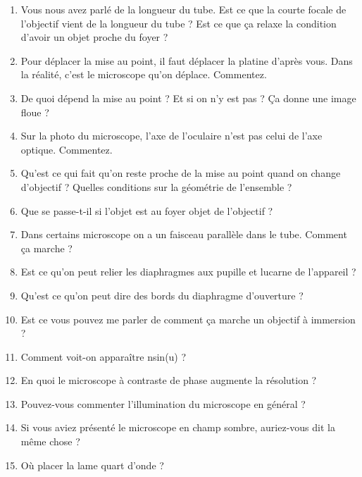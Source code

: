 \begin{enumerate}
\item Vous nous avez parlé de la longueur du tube. Est ce que la courte focale de l'objectif vient de la longueur du tube ? Est ce que ça relaxe la condition d'avoir un objet proche du foyer ?
\item Pour déplacer la mise au point, il faut déplacer la platine d'après vous. Dans la réalité, c'est le microscope qu'on déplace. Commentez.
\item De quoi dépend la mise au point ? Et si on n'y est pas ? Ça donne une image floue ?
\item Sur la photo du microscope, l'axe de l'oculaire n'est pas celui de l'axe optique. Commentez.
\item Qu'est ce qui fait qu'on reste proche de la mise au point quand on change d'objectif ? Quelles conditions sur la géométrie de l'ensemble ?
\item Que se passe-t-il si l'objet est au foyer objet de l'objectif ?
\item Dans certains microscope on a un faisceau parallèle dans le tube. Comment ça marche ?
\item Est ce qu'on peut relier les diaphragmes aux pupille et lucarne de l'appareil ?
\item Qu'est ce qu'on peut dire des bords du diaphragme d'ouverture ?
\item Est ce vous pouvez me parler de comment ça marche un objectif à immersion ?
\item Comment voit-on apparaître nsin(u) ?
\item En quoi le microscope à contraste de phase augmente la résolution ?
\item Pouvez-vous commenter l'illumination du microscope en général ?
\item Si vous aviez présenté le microscope en champ sombre, auriez-vous dit la même chose ?
\item Où placer la lame quart d'onde ?
\end{enumerate}

\newpage